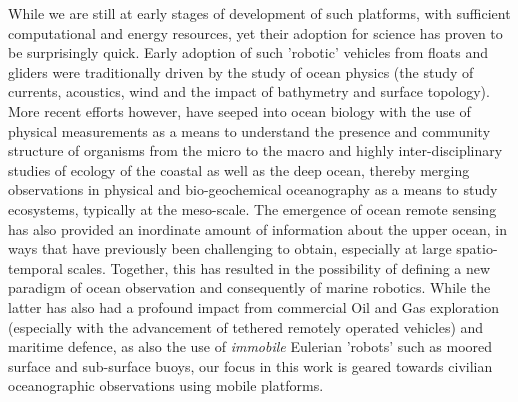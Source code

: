 

While we are still at early stages of development of such platforms,
with sufficient computational and energy resources, yet their adoption
for science has proven to be surprisingly quick. Early adoption of
such 'robotic' vehicles from floats and gliders were traditionally
driven by the study of ocean physics (the study of currents,
acoustics, wind and the impact of bathymetry and surface
topology). More recent efforts however, have seeped into ocean biology
with the use of physical measurements as a means to understand the
presence and community structure of organisms from the micro to the
macro and highly inter-disciplinary studies of ecology of the coastal
as well as the deep ocean, thereby merging observations in physical
and bio-geochemical oceanography as a means to study ecosystems,
typically at the meso-scale. The emergence of ocean remote sensing has
also provided an inordinate amount of information about the upper
ocean, in ways that have previously been challenging to obtain,
especially at large spatio-temporal scales. Together, this has
resulted in the possibility of defining a new paradigm of ocean
observation and consequently of marine robotics. While the latter has
also had a profound impact from commercial Oil and Gas exploration
(especially with the advancement of tethered remotely operated
vehicles) and maritime defence, as also the use of \emph{immobile}
Eulerian 'robots' such as moored surface and sub-surface buoys, our
focus in this work is geared towards civilian oceanographic
observations using mobile platforms.


